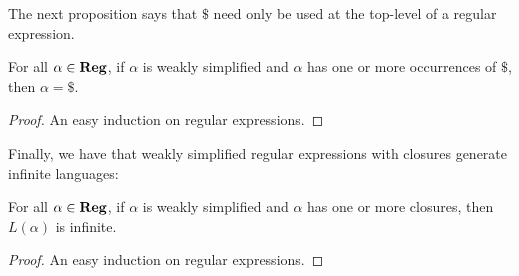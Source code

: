 The next proposition says that $\$$ need only be used at the 
top-level of a regular expression.

\begin{proposition}
\label{WeakSimpProp4}
For all $\alpha\in\mathbf{Reg}$, if $\alpha$ is weakly simplified and $\alpha$ has
one or more occurrences of $\$$, then $\alpha=\$$.
\end{proposition}

\begin{proof}
An easy induction on regular expressions.
\end{proof}

Finally, we have that weakly simplified regular expressions with
closures generate infinite languages:

\begin{proposition}
For all $\alpha\in\mathbf{Reg}$, if $\alpha$ is weakly simplified and
$\alpha$ has one or more closures, then $L(\alpha)$ is
infinite.
\end{proposition}

\begin{proof}
An easy induction on regular expressions.
\end{proof}

